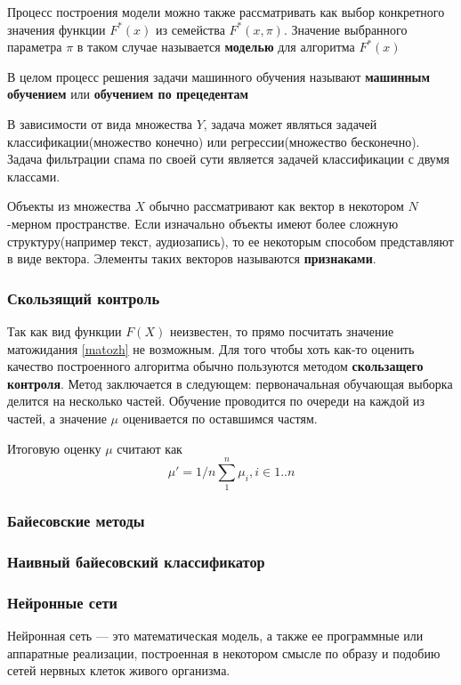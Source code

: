 Процесс построения модели можно также рассматривать как выбор конкретного значения функции $F^*(x)$ из семейства $F^*(x, \pi)$. Значение выбранного параметра $\pi$ в таком случае называется \textbf{моделью} для алгоритма
$F^*(x)$

В целом процесс решения задачи машинного обучения называют \textbf{машинным обучением} или \textbf{обучением по прецедентам}

В зависимости от вида множества $Y$, задача может являться задачей классификации(множество конечно) или регрессии(множество бесконечно).
Задача фильтрации спама по своей сути является задачей классификации с двумя классами.

Объекты из множества $X$ обычно рассматривают как вектор в некотором $N$-мерном пространстве. Если изначально объекты имеют более сложную структуру(например текст, аудиозапись), то ее некоторым способом представляют в виде вектора. Элементы таких векторов называются \textbf{признаками}.

\subsubsection{Скользящий контроль}
Так как вид функции $F(X)$  неизвестен, то прямо посчитать значение матожидания \ref{matozh} не возможным. Для того чтобы хоть как-то оценить качество построенного алгоритма обычно пользуются методом \textbf{скользащего контроля}. Метод заключается в следующем: первоначальная обучающая выборка делится на несколько частей. Обучение проводится по очереди на каждой из частей, а значение $\mu$ оценивается по оставшимся частям.

Итоговую оценку $\mu$ считают как
\begin{equation}
\mu' = 1/n\sum_1^n{\mu_i}, i \in 1..n
\end{equation}

\subsubsection{Байесовские методы}
\subsubsection{Наивный байесовский классификатор}
\subsubsection{Нейронные сети}
Нейронная сеть — это математическая модель, а также ее программные или аппаратные реализации, построенная в некотором смысле по образу и подобию сетей нервных клеток живого организма.

